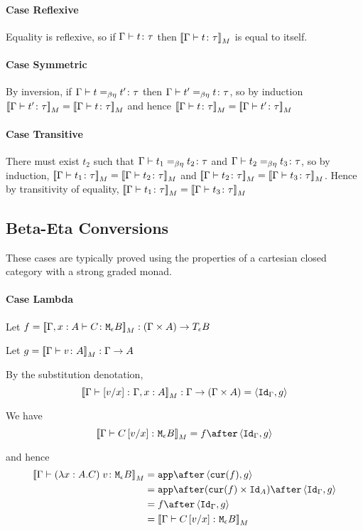 {    \paragraph{Case Reflexive}
    Equality is reflexive, so if $\gtyperelation{t}{\tau}$ then $\deno{\gtyperelation{t}{\tau}}$ is equal to itself.
    \paragraph{Case Symmetric}
    By inversion, if $\gberelation{t}{t'}{\tau}$ then $\gberelation{t'}{t}{\tau}$, so by induction $\gdenoequality{t'}{t}{\tau}$ and hence $\gdenoequality{t}{t'}{\tau}$
    \paragraph{Case Transitive}
    There must exist $t_2$ such that $\gberelation{t_1}{t_2}{\tau}$ and $\gberelation{t_2}{t_3}{\tau}$, so by induction,
    $\gdenoequality{t_1}{t_2}{\tau}$ and $\gdenoequality{t_2}{t_3}{\tau}$. Hence by transitivity of equality, $\gdenoequality{t_1}{t_3}{\tau}$

    \subsection{Beta-Eta Conversions}
    These cases are typically proved using the properties of a cartesian closed category with a strong graded monad.

    \paragraph{Case Lambda}
        Let $f = \deno{\typerelation{\gax}{C}{\meb}}: (\G \times A) \rightarrow\teb$

        Let $g = \deno{\gtyperelation{v}{A}}: \G \rightarrow A$

        By the substitution denotation, $$\deno{\typerelation{\G}{\ssub{x}{v}}{\gax}}: \G \rightarrow (\G \times A) = \pr{\idg}{g}$$

        We have $$\deno{\gtyperelation{C\ssub{x}{v}}{\meb}} = f \after \pr{\idg}{g}$$

        and hence
        \begin{equation}
            \begin{split}
                \deno{\gtyperelation{\apply{(\lam{x}{A}{C})}{v}}{\meb}} & = \app\after\pr{\cur{f}}{g} \\
                & = \app\after(\cur{f}\times\Id{A})\after\pr{\idg}{g}\\
                & = f \after \pr{\idg}{g} \\
                & = \deno{\gtyperelation{C\ssub{x}{v}}{\meb}}  
            \end{split}
        \end{equation}
       

}
